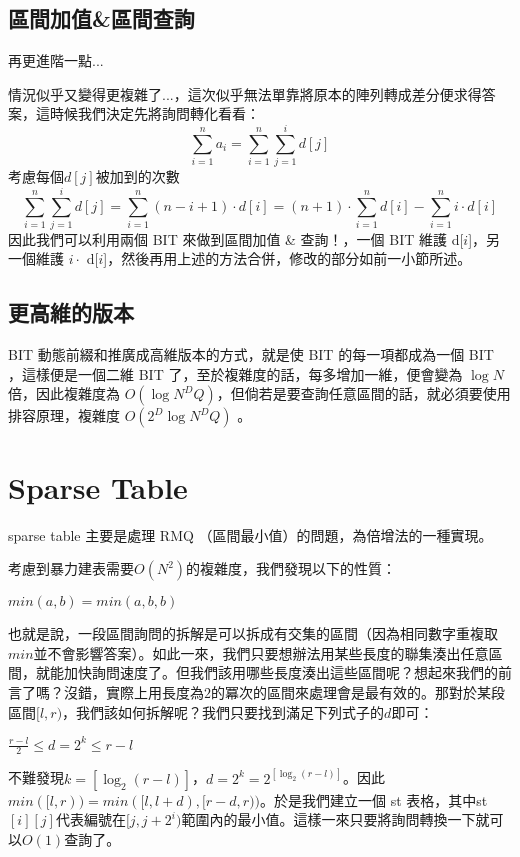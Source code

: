 \documentclass[main.tex]{subfiles}
\begin{document}
	\subsection{區間加值\&區間查詢}
	再更進階一點...
\par 情況似乎又變得更複雜了...，這次似乎無法單靠將原本的陣列轉成差分便求得答案，這時候我們決定先將詢問轉化看看：
$$\sum_{i=1}^{n} a_i = \sum_{i=1}^{n}\sum_{j=1}^{i} d[j]$$
考慮每個$d[j]$被加到的次數
$$\sum_{i=1}^{n}\sum_{j=1}^{i} d[j] = \sum_{i=1}^{n} (n-i+1) \cdot d[i] = (n+1) \cdot \sum_{i=1}^{n} d[i] - \sum_{i=1}^{n} i \cdot d[i]$$
因此我們可以利用兩個 BIT 來做到區間加值 \& 查詢！，一個 BIT 維護 d[$i$]，另一個維護 $i \cdot$ d[$i$]，然後再用上述的方法合併，修改的部分如前一小節所述。
	\subsection{更高維的版本}
	BIT 動態前綴和推廣成高維版本的方式，就是使 BIT 的每一項都成為一個 BIT ，這樣便是一個二維 BIT 了，至於複雜度的話，每多增加一維，便會變為 $\log{N}$ 倍，因此複雜度為 $O(\log{N}^DQ)$，但倘若是要查詢任意區間的話，就必須要使用排容原理，複雜度 $O(2^D\log{N}^DQ)$ 。
	
\section{Sparse Table}
sparse table 主要是處理 RMQ （區間最小值）的問題，為倍增法的一種實現。

考慮到暴力建表需要$O(N^2)$的複雜度，我們發現以下的性質：
\begin{center}
$min(a,b)=min(a,b,b)$\\
\end{center}
也就是說，一段區間詢問的拆解是可以拆成有交集的區間（因為相同數字重複取$min$並不會影響答案）。如此一來，我們只要想辦法用某些長度的聯集湊出任意區間，就能加快詢問速度了。但我們該用哪些長度湊出這些區間呢？想起來我們的前言了嗎？沒錯，實際上用長度為$2$的冪次的區間來處理會是最有效的。那對於某段區間$[l,r)$，我們該如何拆解呢？我們只要找到滿足下列式子的$d$即可：
\begin{center}
$\frac{r-l}{2} \leq d=2^k\leq r-l$
\end{center}
不難發現$k=[\log _2 (r-l)]$，$d=2^k =2^[\log _2 (r-l)]$。因此$min([l,r))=min([l,l+d),[r-d,r))$。於是我們建立一個 st 表格，其中st$[i][j]$代表編號在$[j,j+2^i)$範圍內的最小值。這樣一來只要將詢問轉換一下就可以$O(1)$查詢了。
\end{document}
